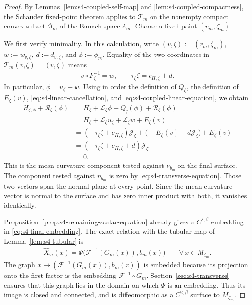 \documentclass[a4paper,11pt,oneside,reqno]{amsart}
\numberwithin{equation}{section}
\theoremstyle{definition}
\begin{document}
\begin{proof}
    By Lemmas~\ref{lem:s4-coupled-self-map} and
    \ref{lem:s4-coupled-compactness}, the Schauder fixed-point
    theorem applies to $\mathcal T_m$ on the nonempty compact
    convex subset $\mathcal B_m$ of the Banach space
    $\mathcal E_m$. Choose a fixed point $(v_m,\zeta_m)$.

    We first verify minimality. In this calculation, write
    $(v,\zeta):=(v_m,\zeta_m)$, $w:=w_{v,\zeta}$,
    $d:=d_{v,\zeta}$, and $\phi:=\phi_m$.
    Equality of the two coordinates in
    $\mathcal T_m(v,\zeta)=(v,\zeta)$ means
    \begin{align}
        \label{eq:s4-fixed-point-identities}
        v\circ F_\zeta^{-1}=w,
        \qquad
        \tau_\zeta\zeta=c_{H,\zeta}+d.
    \end{align}
    In particular, $\phi=u_\zeta+w$. Using in order the
    definition of $Q_\zeta$, the definition of $E_\zeta(v)$,
    \eqref{eq:s4-linear-cancellation}, and
    \eqref{eq:s4-coupled-linear-equation}, we obtain
    \begin{align*}
        H_{\zeta,\phi}+\mathcal R_\zeta(\phi)
        &=H_\zeta+\mathcal L_\zeta\phi
        +Q_\zeta(\phi)+\mathcal R_\zeta(\phi)\\
        &=H_\zeta+\mathcal L_\zeta u_\zeta
        +\mathcal L_\zeta w+E_\zeta(v)\\
        &=(-\tau_\zeta\zeta+c_{H,\zeta})\mathcal J_\zeta
        +\bigl(-E_\zeta(v)+d\mathcal J_\zeta\bigr)
        +E_\zeta(v)\\
        &=(-\tau_\zeta\zeta+c_{H,\zeta}+d)
        \mathcal J_\zeta\\
        &=0.
    \end{align*}
    This is the mean-curvature component tested against
    $\nu_{b_m}$ on the final surface. The component tested
    against $n_{b_m}$ is zero by
    \eqref{eq:s4-transverse-equation}. Those two vectors span
    the normal plane at every point. Since the mean-curvature
    vector is normal to the surface and has zero inner product
    with both, it vanishes identically.

    Proposition~\ref{prop:s4-remaining-scalar-equation} already
    gives a $C^{2,\beta}$ embedding in
    \eqref{eq:s4-final-embedding}. The exact relation with the
    tubular map of Lemma~\ref{lem:s4-tubular} is
    \begin{align*}
        \widehat X_m(x)
        =\Psi\bigl(\mathcal F^{-1}(G_m(x)),b_m(x)\bigr)
        \qquad\forall\,x\in M_{\zeta_m}.
    \end{align*}
    The graph $x\mapsto(\mathcal F^{-1}(G_m(x)),b_m(x))$
    is embedded because its projection onto the first factor
    is the embedding $\mathcal F^{-1}\circ G_m$.
    Section~\ref{sec:s4-transverse} ensures that this graph
    lies in the domain on which $\Psi$ is an embedding.
    Thus its image is closed and connected,
    and is diffeomorphic as a $C^{2,\beta}$ surface to
    $M_{\zeta_m}$.


\end{proof}
\end{document}
